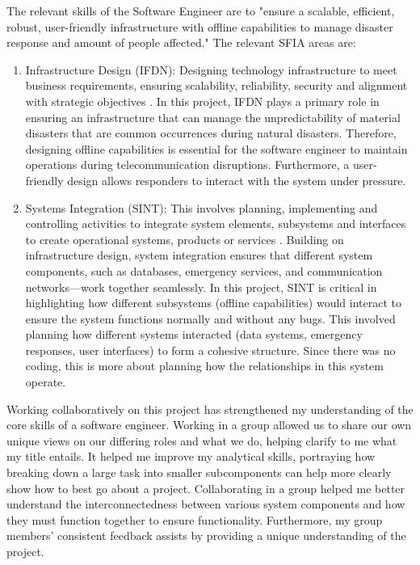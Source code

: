 \documentclass[a4paper, 11pt]{report}
\begin{document}
The relevant skills of the Software Engineer are to "ensure a scalable, efficient, robust, user-friendly infrastructure with offline capabilities to manage disaster response and amount of people affected." The relevant SFIA areas are:
\begin{enumerate}
	\item Infrastructure Design (IFDN): Designing technology infrastructure to meet business requirements, ensuring scalability, reliability, security and alignment with strategic objectives \cite{palma2023}. In this project, IFDN plays a primary role in ensuring an infrastructure that can manage the unpredictability of material disasters that are common occurrences during natural disasters. Therefore, designing offline capabilities is essential for the software engineer to maintain operations during telecommunication disruptions. Furthermore, a user-friendly design allows responders to interact with the system under pressure.
	\item Systems Integration (SINT): This involves planning, implementing and controlling activities to integrate system elements, subsystems and interfaces to create operational systems, products or services \cite{palma2023}. Building on infrastructure design, system integration ensures that different system components, such as databases, emergency services, and communication networks—work together seamlessly. In this project, SINT is critical in highlighting how different subsystems (offline capabilities) would interact to ensure the system functions normally and without any bugs. This involved planning how different systems interacted (data systems, emergency responses, user interfaces) to form a cohesive structure. Since there was no coding, this is more about planning how the relationships in this system operate.
 \end{enumerate}

Working collaboratively on this project has strengthened my understanding of the core skills of a software engineer. Working in a group allowed us to share our own unique views on our differing roles and what we do, helping clarify to me what my title entails. It helped me improve my analytical skills, portraying how breaking down a large task into smaller subcomponents can help more clearly show how to best go about a project. Collaborating in a group helped me better understand the interconnectedness between various system components and how they must function together to ensure functionality. Furthermore, my group members' consistent feedback assists by providing a unique understanding of the project.
\end{document}
